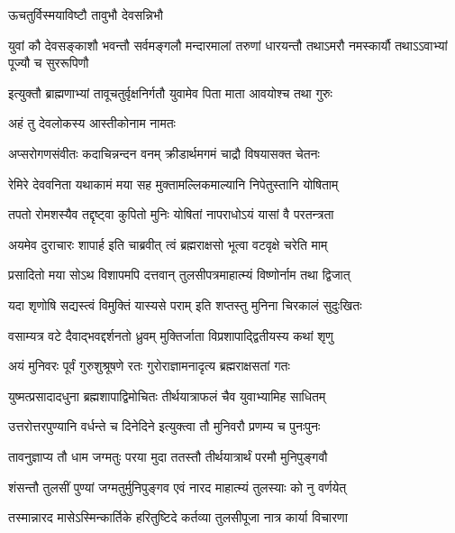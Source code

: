 \onelineshloka
{ऊचतुर्विस्मयाविष्टौ तावुभौ देवसन्निभौ} %



\threelineshloka
{युवां कौ देवसङ्काशौ भवन्तौ सर्वमङ्गलौ}
{मन्दारमालां तरुणां धारयन्तौ तथाऽमरौ}
{नमस्कार्यौ तथाऽऽवाभ्यां पूज्यौ च सुररूपिणौ} %

\twolineshloka
{इत्युक्तौ ब्राह्मणाभ्यां तावूचतुर्वृक्षनिर्गतौ}
{युवामेव पिता माता आवयोश्च तथा गुरुः} %




\onelineshloka
{अहं तु देवलोकस्य आस्तीकोनाम नामतः} %

\twolineshloka
{अप्सरोगणसंवीतः कदाचिन्नन्दन वनम्}
{क्रीडार्थमगमं चाद्रौ विषयासक्त चेतनः} %

\twolineshloka
{रेमिरे देववनिता यथाकामं मया सह}
{मुक्तामल्लिकमाल्यानि निपेतुस्तानि योषिताम्} %

\twolineshloka
{तपतो रोमशस्यैव तद्दृष्ट्वा कुपितो मुनिः}
{योषितां नापराधोऽयं यासां वै परतन्त्रता} %

\twolineshloka
{अयमेव दुराचारः शापार्ह इति चाब्रवीत्}
{त्वं ब्रह्मराक्षसो भूत्वा वटवृक्षे चरेति माम्} %

\twolineshloka
{प्रसादितो मया सोऽथ विशापमपि दत्तवान्}
{तुलसीपत्रमाहात्म्यं विष्णोर्नाम तथा द्विजात्} %

\twolineshloka
{यदा शृणोषि सद्यस्त्वं विमुक्तिं यास्यसे पराम्}
{इति शप्तस्तु मुनिना चिरकालं सुदुःखितः} %

\twolineshloka
{वसाम्यत्र वटे दैवाद्भवद्दर्शनतो ध्रुवम्}
{मुक्तिर्जाता विप्रशापाद्द्वितीयस्य कथां शृणु} %

\twolineshloka
{अयं मुनिवरः पूर्वं गुरुशुश्रूषणे रतः}
{गुरोराज्ञामनादृत्य ब्रह्मराक्षसतां गतः} %

\twolineshloka
{युष्मत्प्रसादादधुना ब्रह्मशापाद्विमोचितः}
{तीर्थयात्राफलं चैव युवाभ्यामिह साधितम्} %

\twolineshloka
{उत्तरोत्तरपुण्यानि वर्धन्ते च दिनेदिने}
{इत्युक्त्वा तौ मुनिवरौ प्रणम्य च पुनःपुनः} %

\twolineshloka
{तावनुज्ञाप्य तौ धाम जग्मतुः परया मुदा}
{ततस्तौ तीर्थयात्रार्थं परमौ मुनिपुङ्गवौ} %

\twolineshloka
{शंसन्तौ तुलसीं पुण्यां जग्मतुर्मुनिपुङ्गव}
{एवं नारद माहात्म्यं तुलस्याः को नु वर्णयेत्} %

\twolineshloka
{तस्मान्नारद मासेऽस्मिन्कार्तिके हरितुष्टिदे}
{कर्तव्या तुलसीपूजा नात्र कार्या विचारणा} %


